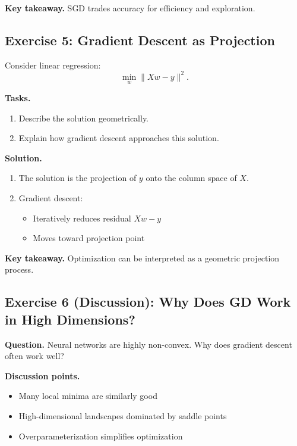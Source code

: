 \medskip

\noindent
\textbf{Key takeaway.}  
SGD trades accuracy for efficiency and exploration.

\subsection{Exercise 5: Gradient Descent as Projection}

Consider linear regression:
\[
\min_w \|Xw - y\|^2.
\]

\medskip

\noindent
\textbf{Tasks.}
\begin{enumerate}
    \item Describe the solution geometrically.
    \item Explain how gradient descent approaches this solution.
\end{enumerate}

\medskip

\noindent
\textbf{Solution.}

\begin{enumerate}
\item The solution is the projection of $y$ onto the column space of $X$.

\item Gradient descent:
\begin{itemize}
    \item Iteratively reduces residual $Xw - y$
    \item Moves toward projection point
\end{itemize}
\end{enumerate}

\medskip

\noindent
\textbf{Key takeaway.}  
Optimization can be interpreted as a geometric projection process.

\subsection{Exercise 6 (Discussion): Why Does GD Work in High Dimensions?}

\textbf{Question.}  
Neural networks are highly non-convex. Why does gradient descent often work well?

\medskip

\noindent
\textbf{Discussion points.}
\begin{itemize}
    \item Many local minima are similarly good
    \item High-dimensional landscapes dominated by saddle points
    \item Overparameterization simplifies optimization
\end{itemize}

